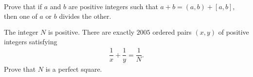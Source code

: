 \documentclass{subfile}
\begin{document}
%

	\begin{problem}
		Prove that if $a$ and $b$ are positive integers such that $a+b=(a,b)+[a,b]$, then one of $a$ or $b$ divides the other.
	\end{problem}

%
%
%

	\begin{problem} %
		The integer $N$ is positive. There are exactly $2005$ ordered pairs $(x, y)$ of positive integers satisfying
			\begin{align*}
				\dfrac{1}{x} + \dfrac{1}{y} = \dfrac{1}{N}.
			\end{align*}
		Prove that $N$ is a perfect square.
	\end{problem}
\end{document}
